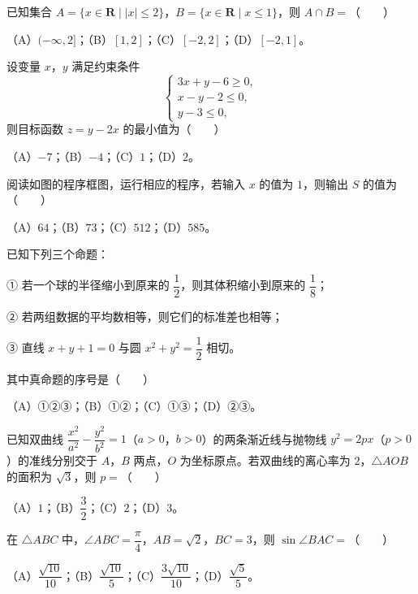 \begin{question}
已知集合 $A=\{x\in\mathbf{R}\mid |x|\leqslant 2\}$，$B=\{x\in\mathbf{R}\mid x\leqslant 1\}$，则 $A\cap B=$\mbox{（　　）}

（A）$(-\infty,2]$；（B）$[1,2]$；（C）$[-2,2]$；（D）$[-2,1]$。

\end{question}
\begin{question}
设变量 $x$，$y$ 满足约束条件
\nopagebreak[4]
\[\begin{cases}
3x+y-6\geqslant 0,\\
x-y-2\leqslant 0,\\
y-3\leqslant 0,
\end{cases}\]
则目标函数 $z=y-2x$ 的最小值为\mbox{（　　）}

（A）$-7$；（B）$-4$；（C）$1$；（D）$2$。

\Needspace{0.4\textheight}
\end{question}
\begin{question}
阅读如图的程序框图，运行相应的程序，若输入 $x$ 的值为 $1$，则输出 $S$ 的值为\mbox{（　　）}
\nopagebreak[4]
\begin{center}\end{center}
\nopagebreak[4]
（A）$64$；（B）$73$；（C）$512$；（D）$585$。

\end{question}
\begin{question}
已知下列三个命题：

① 若一个球的半径缩小到原来的 $\dfrac12$，则其体积缩小到原来的 $\dfrac18$；

② 若两组数据的平均数相等，则它们的标准差也相等；

③ 直线 $x+y+1=0$ 与圆 $x^2+y^2=\dfrac12$ 相切。

其中真命题的序号是\mbox{（　　）}

（A）①②③；（B）①②；（C）①③；（D）②③。

\end{question}
\begin{question}
已知双曲线 $\dfrac{x^2}{a^2}-\dfrac{y^2}{b^2}=1$（$a>0$，$b>0$）的两条渐近线与抛物线 $y^2=2px$（$p>0$）的准线分别交于 $A$，$B$ 两点，$O$ 为坐标原点。若双曲线的离心率为 $2$，$\triangle AOB$ 的面积为 $\sqrt3$，则 $p=$\mbox{（　　）}

（A）$1$；（B）$\dfrac32$；（C）$2$；（D）$3$。

\end{question}
\begin{question}
在 $\triangle ABC$ 中，$\angle ABC=\dfrac{\pi}{4}$，$AB=\sqrt2$，$BC=3$，则 $\sin\angle BAC=$\mbox{（　　）}

（A）$\dfrac{\sqrt{10}}{10}$；（B）$\dfrac{\sqrt{10}}{5}$；（C）$\dfrac{3\sqrt{10}}{10}$；（D）$\dfrac{\sqrt5}{5}$。

\end{question}
